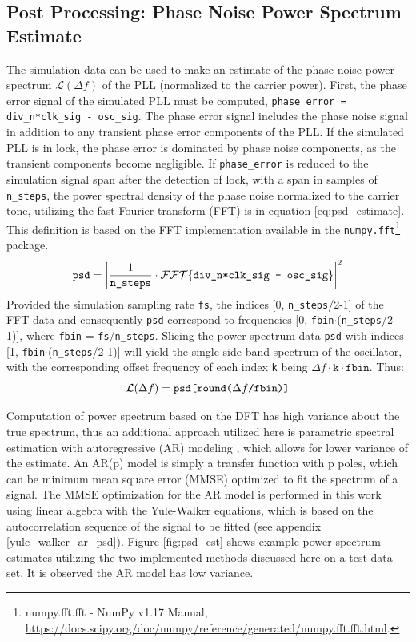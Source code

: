 \subsection{Post Processing: Phase Noise Power Spectrum Estimate}
The simulation data can be used to make an estimate of the phase noise power spectrum $\mathcal{L}(\Delta f)$ of the PLL (normalized to the carrier power). First, the phase error signal of the simulated PLL must be computed, \texttt{phase\_error = div\_n*clk\_sig - osc\_sig}. The phase error signal includes the phase noise signal in addition to any transient phase error components of the PLL. If the simulated PLL is in lock, the phase error is dominated by phase noise components, as the transient components become negligible. If \texttt{phase\_error} is reduced to the simulation signal span after the detection of lock, with a span in samples of \texttt{n\_steps}, the power spectral density of the phase noise normalized to the carrier tone, utilizing the fast Fourier transform (FFT) is in equation \ref{eq:psd_estimate}. This definition is based on the FFT implementation available in the \texttt{numpy.fft}\footnote{numpy.fft.fft - NumPy v1.17 Manual, \url{https://docs.scipy.org/doc/numpy/reference/generated/numpy.fft.fft.html}.} package.
\begin{equation}\label{eq:psd_estimate}
	\text{\texttt{psd}} = \left|\frac{1}{\text{\texttt{n\_steps}}}\cdot\mathcal{FFT}\{\text{\texttt{div\_n*clk\_sig - osc\_sig}}\}\right|^2
\end{equation}
Provided the simulation sampling rate \texttt{fs}, the indices [0, \texttt{n\_steps}/2-1] of the FFT data and consequently \texttt{psd} correspond to frequencies [0, \texttt{fbin}$\cdot$(\texttt{n\_steps}/2-1)], where \texttt{fbin} = \texttt{fs}/\texttt{n\_steps}. Slicing the power spectrum data \texttt{psd} with indices [1, \texttt{fbin}$\cdot$(\texttt{n\_steps}/2-1)] will yield the single side band spectrum of the oscillator, with the corresponding offset frequency of each index \texttt{k} being $\Delta f\cdot \mathtt{k}\cdot\mathtt{fbin}$. Thus:
\begin{equation}
	\mathcal{L}(\Delta f) = \text{\texttt{psd[round(}}\Delta f\text{\texttt{/fbin)]}}
\end{equation}

Computation of power spectrum based on the DFT has high variance about the true spectrum, thus an additional approach utilized here is parametric spectral estimation with autoregressive (AR) modeling \cite{proakis_1993_psd}, which allows for lower variance of the estimate. An AR(p) model is simply a transfer function with p poles, which can be minimum mean square error (MMSE) optimized to fit the spectrum of a signal. The MMSE optimization for the AR model is performed in this work using linear algebra with the Yule-Walker equations, which is based on the autocorrelation sequence of the signal to be fitted (see appendix \ref{yule_walker_ar_psd}). Figure \ref{fig:psd_est} shows example power spectrum estimates utilizing the two implemented methods discussed here on a test data set. It is observed the AR model has low variance. 

